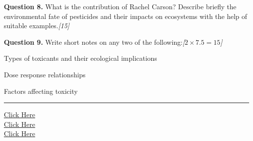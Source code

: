 \documentclass[11pt,a4paper]{article}
\newcommand{\pts}[1]{\hfill   \textit{[#1]}}
\begin{document}
\medskip


\noindent   \textbf{Question 8.} What is the contribution of Rachel Carson? Describe briefly the environmental fate of pesticides and their impacts on ecosystems with the help of suitable examples.\pts{15}

\medskip


\noindent   \textbf{Question 9.} Write short notes on any two of the following:\pts{$2  \times 7.5 = 15$}

\begin{parts}
  \item Types of toxicants and their ecological implications
  \item Dose response relationships
  \item Factors affecting toxicity
\end{parts}

\vfill
\rule{\linewidth}{0.4pt}

\begin{center}\small
\href{https://bhu-exam.vercel.app/}{Click Here}\\[4pt]\href{https://me-aryan.vercel.app/}{Click Here}\\[4pt]\href{https://quashan-me.vercel.app/}{Click Here}
\end{center}
\end{document}
